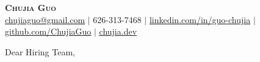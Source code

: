 \documentclass[letterpaper,10pt]{article}
\begin{document}
\begin{center}
	\textbf{\Huge \scshape Chujia Guo} \\ \vspace{1pt}
	\href{mailto:chujiaguo@gmail.com}{\underline{chujiaguo@gmail.com}}  $|$ \small 626-313-7468 $|$
\href{https://linkedin.com/in/guo-chujia}{\underline{linkedin.com/in/guo-chujia}}  $|$
	\href{https://github.com/ChujiaGuo}{\underline{github.com/ChujiaGuo}} $|$
    \href{https://chujia.dev}{\underline{chujia.dev}}
\end{center}

\date{\today}
\vspace{24pt}

Dear Hiring Team, \\ \vspace{6pt}
\end{document}
